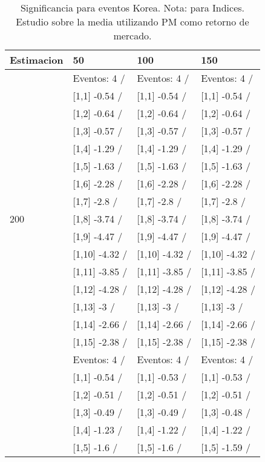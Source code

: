 \begin{table}

\caption{Significancia para eventos Korea. Nota: para Indices. Estudio sobre la media utilizando PM como retorno de mercado.}
\centering
\begin{tabular}[t]{llll}
\toprule
Estimacion & 50 & 100 & 150\\
\midrule
 & Eventos:  4 / & Eventos:  4 / & Eventos:  4 /\\
 & {}[1,1] -0.54  / & {}[1,1] -0.54  / & {}[1,1] -0.54  /\\
 & {}[1,2] -0.64  / & {}[1,2] -0.64  / & {}[1,2] -0.64  /\\
 & {}[1,3] -0.57  / & {}[1,3] -0.57  / & {}[1,3] -0.57  /\\
 & {}[1,4] -1.29  / & {}[1,4] -1.29  / & {}[1,4] -1.29  /\\
\addlinespace
 & {}[1,5] -1.63  / & {}[1,5] -1.63  / & {}[1,5] -1.63  /\\
 & {}[1,6] -2.28  / & {}[1,6] -2.28  / & {}[1,6] -2.28  /\\
 & {}[1,7] -2.8  / & {}[1,7] -2.8  / & {}[1,7] -2.8  /\\
200 & {}[1,8] -3.74  / & {}[1,8] -3.74  / & {}[1,8] -3.74  /\\
 & {}[1,9] -4.47  / & {}[1,9] -4.47  / & {}[1,9] -4.47  /\\
\addlinespace
 & {}[1,10] -4.32  / & {}[1,10] -4.32  / & {}[1,10] -4.32  /\\
 & {}[1,11] -3.85  / & {}[1,11] -3.85  / & {}[1,11] -3.85  /\\
 & {}[1,12] -4.28  / & {}[1,12] -4.28  / & {}[1,12] -4.28  /\\
 & {}[1,13] -3  / & {}[1,13] -3  / & {}[1,13] -3  /\\
 & {}[1,14] -2.66  / & {}[1,14] -2.66  / & {}[1,14] -2.66  /\\
\addlinespace
 & {}[1,15] -2.38  / & {}[1,15] -2.38  / & {}[1,15] -2.38  /\\
 & Eventos:  4 / & Eventos:  4 / & Eventos:  4 /\\
 & {}[1,1] -0.54  / & {}[1,1] -0.53  / & {}[1,1] -0.53  /\\
 & {}[1,2] -0.51  / & {}[1,2] -0.51  / & {}[1,2] -0.51  /\\
 & {}[1,3] -0.49  / & {}[1,3] -0.49  / & {}[1,3] -0.48  /\\
\addlinespace
 & {}[1,4] -1.23  / & {}[1,4] -1.22  / & {}[1,4] -1.22  /\\
 & {}[1,5] -1.6  / & {}[1,5] -1.6  / & {}[1,5] -1.59  /\\

\end{tabular}
\end{table}
